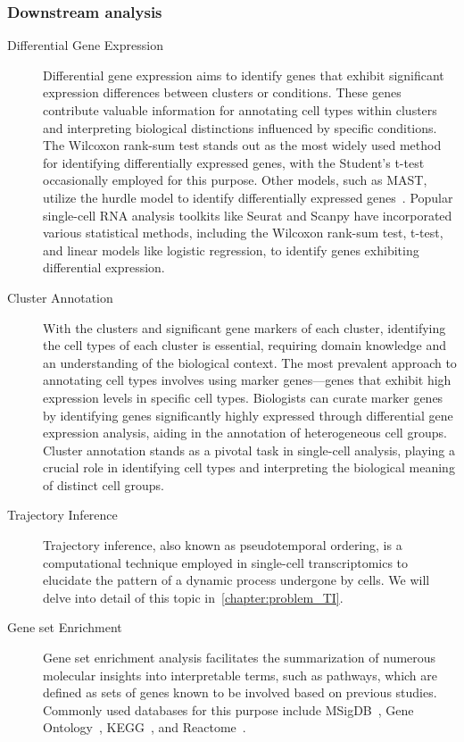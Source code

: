 \subsubsection{Downstream analysis}
\begin{description}
	\item[Differential Gene Expression]
	Differential gene expression aims to identify genes that exhibit significant expression differences between clusters or conditions. These genes contribute valuable information for annotating cell types within clusters and interpreting biological distinctions influenced by specific conditions. The Wilcoxon rank-sum test stands out as the most widely used method for identifying differentially expressed genes, with the Student's t-test occasionally employed for this purpose. Other models, such as MAST, utilize the hurdle model to identify differentially expressed genes~\citep{finak2015mast}. Popular single-cell RNA analysis toolkits like Seurat and Scanpy have incorporated various statistical methods, including the Wilcoxon rank-sum test, t-test, and linear models like logistic regression, to identify genes exhibiting differential expression.

	\item[Cluster Annotation]
	With the clusters and significant gene markers of each cluster, identifying the cell types of each cluster is essential, requiring domain knowledge and an understanding of the biological context. The most prevalent approach to annotating cell types involves using marker genes—genes that exhibit high expression levels in specific cell types. Biologists can curate marker genes by identifying genes significantly highly expressed through differential gene expression analysis, aiding in the annotation of heterogeneous cell groups. Cluster annotation stands as a pivotal task in single-cell analysis, playing a crucial role in identifying cell types and interpreting the biological meaning of distinct cell groups.

	\item[Trajectory Inference]
	Trajectory inference, also known as pseudotemporal ordering, is a computational technique employed in single-cell transcriptomics to elucidate the pattern of a dynamic process undergone by cells. We will delve into detail of this topic in~\cref{chapter:problem_TI}.

	\item[Gene set Enrichment]
	Gene set enrichment analysis facilitates the summarization of numerous molecular insights into interpretable terms, such as pathways, which are defined as sets of genes known to be involved based on previous studies. Commonly used databases for this purpose include MSigDB~\citep{liberzon2011msigdb}, Gene Ontology~\citep{gene2004go}, KEGG~\citep{kanehisa2007kegg}, and Reactome~\citep{fabregat2018reactome}.
\end{description}

